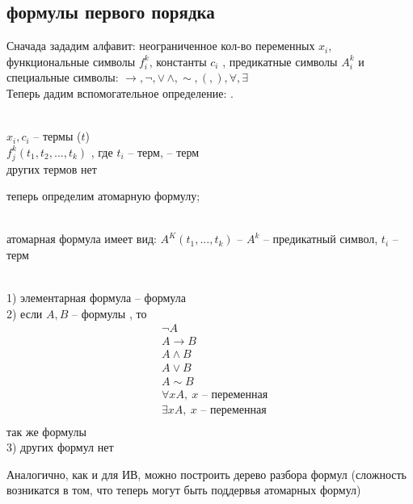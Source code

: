 \subsection{формулы первого порядка}
Сначада зададим алфавит: неограниченное кол-во переменных $x_i$, функциональные символы $f_{i}^{k}$, константы $c_i$ , предикатные символы $A_{i}^{k}$ и специальные символы: $\to, \neg , \lor \, \land , \sim ,( , ) , \forall, \exists$ \\
Теперь дадим вспомогательное определение: .
\begin{definition}  \\
$x_i , c_i$ -- термы ($t$)\\
$f^{k}_{j} (t_1, t_2 , ... ,t_k)$ , где $t_i$ -- терм, -- терм  \\
других термов нет
\end{definition}
теперь определим атомарную формулу;
\begin{definition}  \\
атомарная формула имеет вид: $A^K(t_1, ... , t_k)$ -- $A^k$ -- предикатный символ, $t_i$ -- терм
\end{definition}
\begin{definition}  \\
1) элементарная формула -- формула \\
2) если $A, B $ -- формулы , то
\begin{equation}
    \begin{aligned}
        & \neg A \\
        & A \to B \\
        & A \land B \\
        & A \lor B \\
        & A \sim B \\
        & \forall x A, ~ x  \text{ -- переменная} \\
        & \exists x A, ~ x  \text{ -- переменная} \\
    \end{aligned}
\end{equation}
так же формулы \\
3) других формул нет
\end{definition}
Аналогично, как и для ИВ, можно построить дерево разбора формул (сложность возникатся в том, что теперь могут быть поддервья атомарных формул)\\

